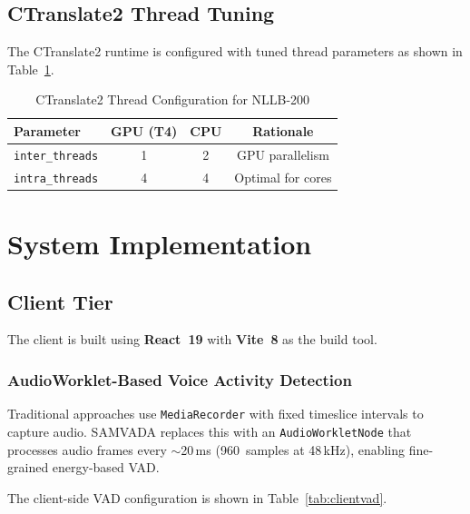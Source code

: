 \documentclass[conference]{IEEEtran}
\begin{document}
\subsection{CTranslate2 Thread Tuning}

The CTranslate2 runtime is configured with tuned thread parameters as shown in Table~\ref{tab:threads}.

\begin{table}[htbp]
\centering
\caption{CTranslate2 Thread Configuration for NLLB-200}
\label{tab:threads}
\begin{tabular}{lccc}
\toprule
\textbf{Parameter} & \textbf{GPU (T4)} & \textbf{CPU} & \textbf{Rationale} \\
\midrule
\texttt{inter\_threads} & 1 & 2 & GPU parallelism \\
\texttt{intra\_threads} & 4 & 4 & Optimal for cores \\
\bottomrule
\end{tabular}
\end{table}

\section{System Implementation}
\label{sec:implementation}

\subsection{Client Tier}

The client is built using \textbf{React~19} with \textbf{Vite~8} as the build tool.

\subsubsection{AudioWorklet-Based Voice Activity Detection}

Traditional approaches use \texttt{MediaRecorder} with fixed timeslice intervals to capture audio. SAMVADA replaces this with an \texttt{AudioWorkletNode} that processes audio frames every $\sim$20\,ms (960~samples at 48\,kHz), enabling fine-grained energy-based VAD.

The client-side VAD configuration is shown in Table~\ref{tab:clientvad}.
\end{document}
